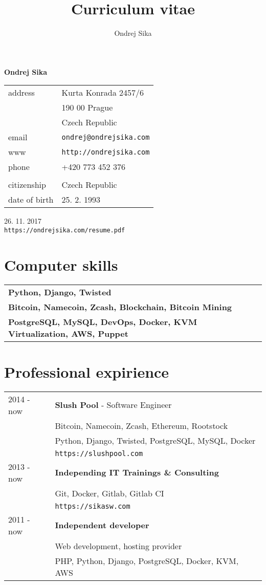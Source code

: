 \documentclass[12pt,a4paper]{article}
\title{Curriculum vitae}
\author{Ondrej Sika}
\begin{document}
\begin{center}
{\LARGE \bf Ondrej Sika}\\
\vspace*{0.2cm}
\begin{tabular}{R{5cm}L{5cm}}
address & Kurta Konrada 2457/6\\
 & 190 00 Prague\\
 & Czech Republic\\
email & \texttt{ondrej@ondrejsika.com}\\
www & \texttt{http://ondrejsika.com}\\
phone & +420 773 452 376\\
\\
citizenship & Czech Republic\\
date of birth & 25. 2. 1993\\
\end{tabular}

\vspace*{0.3cm}
{\hfill 26. 11. 2017}\\
{\hfill \texttt{https://ondrejsika.com/resume.pdf}}
\end{center}

\section*{Computer skills}
\begin{tabular}{@{}ll}
{\bf Python, Django, Twisted} & \\
{\bf Bitcoin, Namecoin, Zcash, Blockchain, Bitcoin Mining} & \\
{\bf PostgreSQL, MySQL, DevOps, Docker, KVM Virtualization, AWS, Puppet} & \\
\end{tabular}

\section*{Professional expirience}
\begin{tabular}{@{}p{2cm}l}
2014 - now & {\bf Slush Pool} - Software Engineer\\
 & Bitcoin, Namecoin, Zcash, Ethereum, Rootstock\\
 & Python, Django, Twisted, PostgreSQL, MySQL, Docker\\
 & \texttt{https://slushpool.com}\\
2013 - now & {\bf Independing IT Trainings \& Consulting }\\
 & Git, Docker, Gitlab, Gitlab CI\\
 & \texttt{https://sikasw.com}\\
2011 - now & {\bf Independent developer}\\
    & Web development, hosting provider\\
    & PHP, Python, Django, PostgreSQL, Docker, KVM, AWS\\
\end{tabular}
\end{document}

